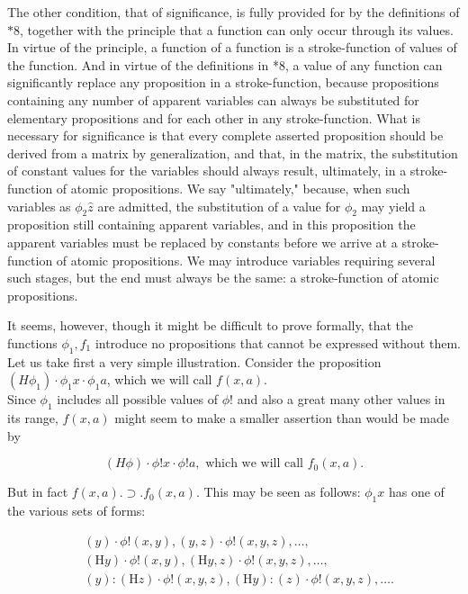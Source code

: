 \documentclass[10pt]{article}
\begin{document}
The other condition, that of significance, is fully provided for by the definitions of $* 8$, together with the principle that a function can only occur through its values. In virtue of the principle, a function of a function is a stroke-function of values of the function. And in virtue of the definitions in *8, a value of any function can significantly replace any proposition in a stroke-function, because propositions containing any number of apparent variables can always be substituted for elementary propositions and for each other in any stroke-function. What is necessary for significance is that every complete asserted proposition should be derived from a matrix by generalization, and that, in the matrix, the substitution of constant values for the variables should always result, ultimately, in a stroke-function of atomic propositions. We say "ultimately," because, when such variables as $\phi_{2} \hat{z}$ are admitted, the substitution of a value for $\phi_{2}$ may yield a proposition still containing apparent variables, and in this proposition the apparent variables must be replaced by constants before we arrive at a stroke-function of atomic propositions. We may introduce variables requiring several such stages, but the end must always be the same: a stroke-function of atomic propositions.

It seems, however, though it might be difficult to prove formally, that the functions $\phi_{1}, f_{1}$ introduce no propositions that cannot be expressed without them. Let us take first a very simple illustration. Consider the proposition\\
$\left(H \phi_{1}\right) \cdot \phi_{1} x \cdot \phi_{1} a$, which we will call $f(x, a)$.\\
Since $\phi_{1}$ includes all possible values of $\phi!$ and also a great many other values in its range, $f(x, a)$ might seem to make a smaller assertion than would be made by

$$
(H \phi) \cdot \phi!x \cdot \phi!a, \text { which we will call } f_{0}(x, a) .
$$

But in fact $f(x, a) . \supset . f_{0}(x, a)$. This may be seen as follows: $\phi_{1} x$ has one of the various sets of forms:

$$
\begin{aligned}
& (y) \cdot \phi!(x, y),(y, z) \cdot \phi!(x, y, z), \ldots, \\
& (\mathrm{H} y) \cdot \phi!(x, y),(\mathrm{H} y, z) \cdot \phi!(x, y, z), \ldots, \\
& (y):(\mathrm{H} z) \cdot \phi!(x, y, z),(\mathrm{H} y):(z) \cdot \phi!(x, y, z), \ldots .
\end{aligned}
$$
\end{document}
